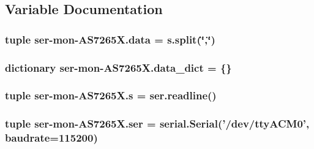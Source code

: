 \subsection{Variable Documentation}
\hypertarget{namespaceser-mon-AS7265X_aee1f9cc5d7cb69238c16b1063ac2ca72}{
\subsubsection[{data}]{\setlength{\rightskip}{0pt plus 5cm}tuple {\bf ser}-\/mon-\/A\-S7265\-X.\-data = s.\-split(\char`\"{},\char`\"{})}}\label{namespaceser-mon-AS7265X_aee1f9cc5d7cb69238c16b1063ac2ca72}
\hypertarget{namespaceser-mon-AS7265X_a2ca2a7586fd8176729e53f614af30eff}{
\subsubsection[{data\-\_\-dict}]{\setlength{\rightskip}{0pt plus 5cm}dictionary {\bf ser}-\/mon-\/A\-S7265\-X.\-data\-\_\-dict = \{\}}}\label{namespaceser-mon-AS7265X_a2ca2a7586fd8176729e53f614af30eff}
\hypertarget{namespaceser-mon-AS7265X_a9378f765d3cec20083312b237c585e4a}{
\subsubsection[{s}]{\setlength{\rightskip}{0pt plus 5cm}tuple {\bf ser}-\/mon-\/A\-S7265\-X.\-s = ser.\-readline()}}\label{namespaceser-mon-AS7265X_a9378f765d3cec20083312b237c585e4a}
\hypertarget{namespaceser-mon-AS7265X_a14d3bc0154dd41ac4329c332a73a9f85}{
\subsubsection[{ser}]{\setlength{\rightskip}{0pt plus 5cm}tuple ser-\/mon-\/A\-S7265\-X.\-ser = {\bf serial.\-Serial}('/dev/tty\-A\-C\-M0', baudrate=115200)}}\label{namespaceser-mon-AS7265X_a14d3bc0154dd41ac4329c332a73a9f85}
